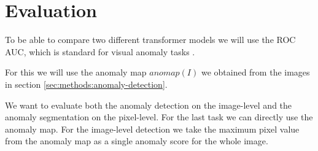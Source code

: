 \section{Evaluation}

To be able to compare two different transformer models we will use the ROC AUC, which is standard for visual anomaly tasks \cite{pirnay_inpainting_2021, zavrtanik_reconstruction_2021, schlegl_unsupervised_2017, li_cutpaste_2021, tsai_autoencoder-based_2021, xie_semisupervised_2021, bergmann_mvtec_2019}.

For this we will use the anomaly map $anomap(I)$ we obtained from the images in section \ref{sec:methods:anomaly-detection}.

We want to evaluate both the anomaly detection on the image-level and the anomaly segmentation on the pixel-level. For the last task we can directly use the anomaly map. For the image-level detection we take the maximum pixel value from the anomaly map as a single anomaly score for the whole image.